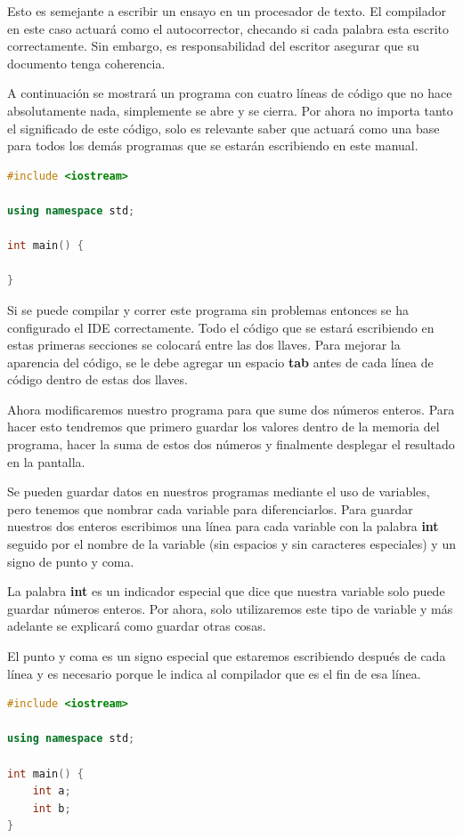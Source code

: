 \documentclass{article}
\begin{document}
Esto es semejante a escribir un ensayo en un procesador de texto. El compilador en este caso actuará como el autocorrector, checando si cada palabra esta escrito correctamente. Sin embargo, es responsabilidad del escritor asegurar que su documento tenga coherencia.

A continuación se mostrará un programa con cuatro líneas de código que no hace absolutamente nada, simplemente se abre y se cierra. Por ahora no importa tanto el significado de este código, solo es relevante saber que actuará como una base para todos los demás programas que se estarán escribiendo en este manual.

\begin{lstlisting}[language=C++, title=Las cuatro líneas esenciales]
#include <iostream>

using namespace std;

int main() {

}
\end{lstlisting}

Si se puede compilar y correr este programa sin problemas entonces se ha configurado el IDE correctamente. Todo el código que se estará escribiendo en estas primeras secciones se colocará entre las dos llaves. Para mejorar la aparencia del código, se le debe agregar un espacio \textbf{tab} antes de cada línea de código dentro de estas dos llaves.

Ahora modificaremos nuestro programa para que sume dos números enteros. Para hacer esto tendremos que primero guardar los valores dentro de la memoria del programa, hacer la suma de estos dos números y finalmente desplegar el resultado en la pantalla.

Se pueden guardar datos en nuestros programas mediante el uso de variables, pero tenemos que nombrar cada variable para diferenciarlos. Para guardar nuestros dos enteros escribimos una línea para cada variable con la palabra \textbf{int} seguido por el nombre de la variable (sin espacios y sin caracteres especiales) y un signo de punto y coma.

La palabra \textbf{int} es un indicador especial que dice que nuestra variable solo puede guardar números enteros. Por ahora, solo utilizaremos este tipo de variable y más adelante se explicará como guardar otras cosas.

El punto y coma es un signo especial que estaremos escribiendo después de cada línea y es necesario porque le indica al compilador que es el fin de esa línea.

\begin{lstlisting}[language=C++, title=Dos variables]
#include <iostream>

using namespace std;

int main() {
	int a;
	int b;
}
\end{lstlisting}
\end{document}
